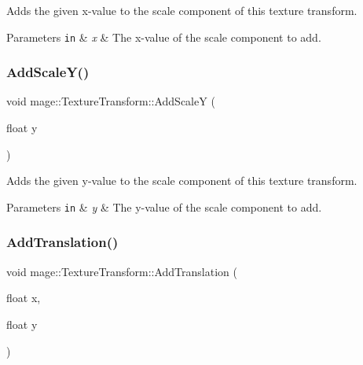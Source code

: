Adds the given x-\/value to the scale component of this texture transform.


\begin{DoxyParams}[1]{Parameters}
\mbox{\tt in}  & {\em x} & The x-\/value of the scale component to add. \\
\hline
\end{DoxyParams}
\hypertarget{structmage_1_1_texture_transform_ac90e21cc9194e52008918a6579bc4021}{}\label{structmage_1_1_texture_transform_ac90e21cc9194e52008918a6579bc4021} 
\subsubsection{\texorpdfstring{Add\+Scale\+Y()}{AddScaleY()}}
{\footnotesize\ttfamily void mage\+::\+Texture\+Transform\+::\+Add\+ScaleY (\begin{DoxyParamCaption}\item[{float}]{y }\end{DoxyParamCaption})\hspace{0.3cm}{\ttfamily [noexcept]}}

Adds the given y-\/value to the scale component of this texture transform.


\begin{DoxyParams}[1]{Parameters}
\mbox{\tt in}  & {\em y} & The y-\/value of the scale component to add. \\
\hline
\end{DoxyParams}
\hypertarget{structmage_1_1_texture_transform_a1710926d2f5292e2b3949fff92424971}{}\label{structmage_1_1_texture_transform_a1710926d2f5292e2b3949fff92424971} 
\subsubsection{\texorpdfstring{Add\+Translation()}{AddTranslation()}\hspace{0.1cm}{\footnotesize\ttfamily [1/3]}}
{\footnotesize\ttfamily void mage\+::\+Texture\+Transform\+::\+Add\+Translation (\begin{DoxyParamCaption}\item[{float}]{x,  }\item[{float}]{y }\end{DoxyParamCaption})\hspace{0.3cm}{\ttfamily [noexcept]}}

